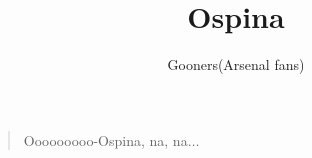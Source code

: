 \documentclass[a4paper,12pt]{article}
\title{Ospina}
\author{Gooners(Arsenal fans)}
\date{}
\begin{document}
	
	\maketitle
	
	\begin{verse}
		
		Ooooooooo-Ospina, na, na$\ldots$
		
	\end{verse}
	
\end{document}
